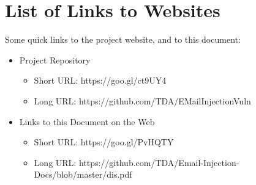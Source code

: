 \chapter{List of Links to Websites}
\pagebreak
Some quick links to the project website, and to this document:
\begin{itemize}
	\item Project Repository
	\begin{itemize}
		\item Short URL: https://goo.gl/ct9UY4
		\item Long URL: https://github.com/TDA/EMailInjectionVuln
	\end{itemize}
	\item Links to this Document on the Web
	\begin{itemize}
		\item Short URL: https://goo.gl/PvHQTY
		\item Long URL: https://github.com/TDA/Email-Injection-Docs/blob/master/dis.pdf
	\end{itemize}
\end{itemize}
